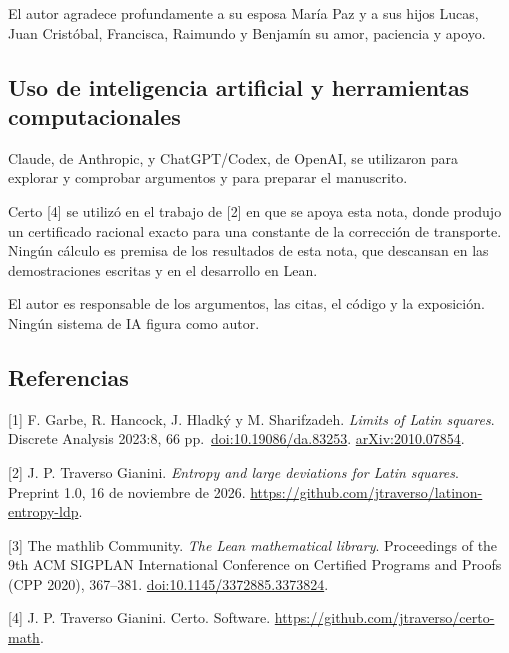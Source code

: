 \documentclass[spanish,11pt,a4paper]{article}
\begin{document}
El autor agradece profundamente a su esposa María Paz y a sus hijos Lucas, Juan Cristóbal, Francisca, Raimundo y Benjamín su amor, paciencia y apoyo.

\subsection{Uso de inteligencia artificial y herramientas computacionales}\label{uso-de-inteligencia-artificial-y-herramientas-computacionales}

Claude, de Anthropic, y ChatGPT/Codex, de OpenAI, se utilizaron para explorar y comprobar argumentos y para preparar el manuscrito.

Certo {[}4{]} se utilizó en el trabajo de {[}2{]} en que se apoya esta nota, donde produjo un certificado racional exacto para una constante de la corrección de transporte. Ningún cálculo es premisa de los resultados de esta nota, que descansan en las demostraciones escritas y en el desarrollo en Lean.

El autor es responsable de los argumentos, las citas, el código y la exposición. Ningún sistema de IA figura como autor.

\subsection{Referencias}\label{referencias}
\begingroup\small

{[}1{]} F. Garbe, R. Hancock, J. Hladký y M. Sharifzadeh. \emph{Limits of Latin squares}. Discrete Analysis 2023:8, 66 pp.~\href{https://doi.org/10.19086/da.83253}{doi:10.19086/da.83253}. \href{https://arxiv.org/abs/2010.07854}{arXiv:2010.07854}.

{[}2{]} J. P. Traverso Gianini. \emph{Entropy and large deviations for Latin squares}. Preprint 1.0, 16 de noviembre de 2026. \url{https://github.com/jtraverso/latinon-entropy-ldp}.

{[}3{]} The mathlib Community. \emph{The Lean mathematical library}. Proceedings of the 9th ACM SIGPLAN International Conference on Certified Programs and Proofs (CPP 2020), 367--381. \href{https://doi.org/10.1145/3372885.3373824}{doi:10.1145/3372885.3373824}.

{[}4{]} J. P. Traverso Gianini. Certo. Software. \url{https://github.com/jtraverso/certo-math}.

\endgroup
\end{document}
